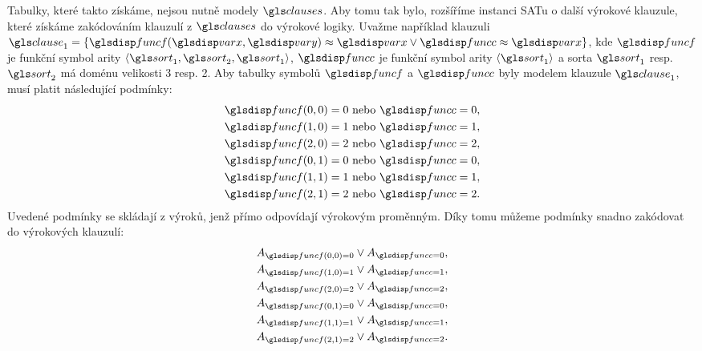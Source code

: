 Tabulky, které takto získáme, nejsou nutně modely $\clauses$.
Aby tomu tak bylo, rozšíříme instanci SATu o další výrokové klauzule,
které získáme zakódováním klauzulí z $\clauses$ do výrokové logiky.
Uvažme například klauzuli
$\clause_1 = \{ \func(\var, \varY) \approx \var \vee \funcC \approx \var \}$,
kde $\func$ je funkční symbol arity
$\langle \sort_1, \sort_2, \sort_1 \rangle$, $\funcC$
je funkční symbol arity $\langle \sort_1 \rangle$ a sorta $\sort_1$
resp. $\sort_2$
má doménu velikosti 3 resp. 2.
Aby tabulky symbolů $\func$ a $\funcC$ byly modelem klauzule
$\clause_1$, musí platit následující podmínky:
\begin{gather*}
  \func(0, 0) = 0 \text{ nebo } \funcC = 0, \\
  \func(1, 0) = 1 \text{ nebo } \funcC = 1, \\
  \func(2, 0) = 2 \text{ nebo } \funcC = 2, \\
  \func(0, 1) = 0 \text{ nebo } \funcC = 0, \\
  \func(1, 1) = 1 \text{ nebo } \funcC = 1, \\
  \func(2, 1) = 2 \text{ nebo } \funcC = 2.
\end{gather*}
Uvedené podmínky se skládají z výroků, jenž přímo odpovídají
vý\-ro\-ko\-vým pro\-měnným.
Díky tomu můžeme podmínky snadno zakódovat do výrokových klauzulí:
\begin{gather*}
  A_{\func(0, 0) = 0} \vee A_{\funcC = 0}, \\
  A_{\func(1, 0) = 1} \vee A_{\funcC = 1}, \\
  A_{\func(2, 0) = 2} \vee A_{\funcC = 2}, \\
  A_{\func(0, 1) = 0} \vee A_{\funcC = 0}, \\
  A_{\func(1, 1) = 1} \vee A_{\funcC = 1}, \\
  A_{\func(2, 1) = 2} \vee A_{\funcC = 2}.
\end{gather*}

